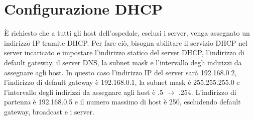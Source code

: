 \section{Configurazione DHCP}
\hspace{24pt}È richiesto che a tutti gli host dell'ospedale, esclusi i server, venga assegnato un indirizzo IP tramite 
DHCP. Per fare ciò, bisogna abilitare il servizio DHCP nel server incaricato e impostare l'indirizzo statico del server 
DHCP, l'indirizzo di default gateway, il server DNS, la subnet mask e l'intervallo degli indirizzi da assegnare agli 
host. In questo caso l'indirizzo IP del server sarà 192.168.0.2, l'indirizzo di default gateway è 192.168.0.1, la 
subnet mask è 255.255.255.0 e l'intervallo degli indirizzi da assegnare agli host è .5 $\rightarrow$ .254. L'indirizzo 
di partenza è 192.168.0.5 e il numero massimo di host è 250, escludendo default gateway, broadcast e i server.